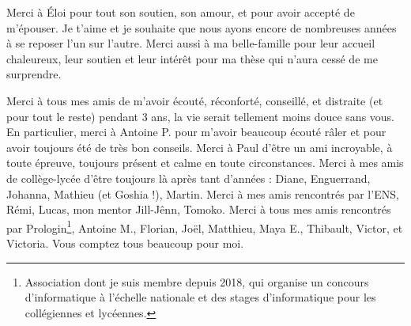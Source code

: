Merci à Éloi pour tout son soutien, son amour, et pour avoir accepté de m’épouser. Je t’aime et je souhaite que nous ayons encore de nombreuses années à se reposer l’un sur l’autre. Merci aussi à ma belle-famille pour leur accueil chaleureux, leur soutien et leur intérêt pour ma thèse qui n’aura cessé de me surprendre.


Merci à tous mes amis de m’avoir écouté, réconforté, conseillé, et distraite (et pour tout le reste) pendant 3 ans, la vie serait tellement moins douce sans vous.
En particulier, merci à Antoine P. pour m’avoir beaucoup écouté râler et pour avoir toujours été de très bon conseils. Merci à Paul d’être un ami incroyable, à toute épreuve, toujours présent et calme en toute circonstances. Merci à mes amis de collège-lycée d’être toujours là après tant d’années : Diane, Enguerrand, Johanna, Mathieu (et Goshia !), Martin. Merci à mes amis rencontrés par l’ENS, Rémi, Lucas, mon mentor Jill-Jênn, Tomoko. Merci à tous mes amis rencontrés par Prologin\footnote{Association dont je suis membre depuis 2018, qui organise un concours d’informatique à l’échelle nationale et des stages d’informatique pour les collégiennes et lycéennes.}, Antoine M., Florian, Joël, Matthieu, Maya E., Thibault, Victor, et Victoria. Vous comptez tous beaucoup pour moi.
